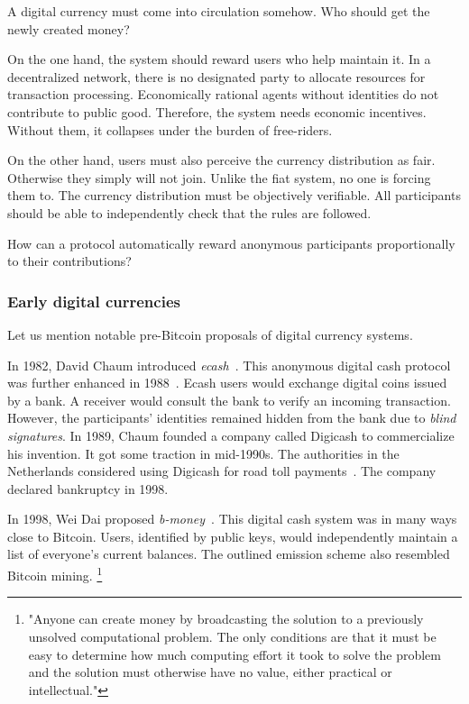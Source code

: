 A digital currency must come into circulation somehow.
Who should get the newly created money?

On the one hand, the system should reward users who help maintain it.
In a decentralized network, there is no designated party to allocate resources for transaction processing.
Economically rational agents without identities do not contribute to public good.
Therefore, the system needs economic incentives.
Without them, it collapses under the burden of free-riders.

On the other hand, users must also perceive the currency distribution as fair.
Otherwise they simply will not join.
Unlike the fiat system, no one is forcing them to.
The currency distribution must be objectively verifiable.
All participants should be able to independently check that the rules are followed.

How can a protocol automatically reward anonymous participants proportionally to their contributions?


\subsubsection*{Early digital currencies}

Let us mention notable pre-Bitcoin proposals of digital currency systems.

In 1982, David Chaum introduced \textit{ecash}~\cite{Chaum1982}.
This anonymous digital cash protocol was further enhanced in 1988~\cite{Chaum1988}.
Ecash users would exchange digital coins issued by a bank.
A receiver would consult the bank to verify an incoming transaction.
However, the participants' identities remained hidden from the bank due to \textit{blind signatures}.
In 1989, Chaum founded a company called Digicash to commercialize his invention.
It got some traction in mid-1990s.
The authorities in the Netherlands considered using Digicash for road toll payments~\cite{Chaum2019}.
The company declared bankruptcy in 1998.

In 1998, Wei Dai proposed \textit{b-money}~\cite{Dai1998}.
This digital cash system was in many ways close to Bitcoin.
Users, identified by public keys, would independently maintain a list of everyone's current balances.
The outlined emission scheme also resembled Bitcoin mining.
\footnote{"Anyone can create money by broadcasting the solution to a previously unsolved computational problem. The only conditions are that it must be easy to determine how much computing effort it took to solve the problem and the solution must otherwise have no value, either practical or intellectual."}

